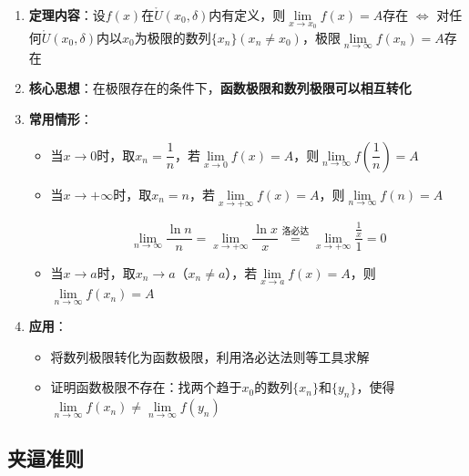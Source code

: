 \documentclass[../book.tex]{subfiles}
\begin{document}
    \begin{enumerate}
        \item \textbf{定理内容}：设$f(x)$在$\mathring{U}(x_0, \delta)$内有定义，则$\lim\limits_{x\to x_0} f(x) = A$存在 $\Leftrightarrow$ 对任何$\mathring{U}(x_0, \delta)$内以$x_0$为极限的数列$\{x_n\}(x_n \neq x_0)$，极限$\lim\limits_{n\to\infty} f(x_n) = A$存在

        \item \textbf{核心思想}：在极限存在的条件下，\textbf{函数极限和数列极限可以相互转化}

        \item \textbf{常用情形}：
        \begin{itemize}
            \item 当$x\to 0$时，取$x_n = \dfrac{1}{n}$，若$\lim\limits_{x\to 0} f(x) = A$，则$\lim\limits_{n\to\infty} f\left(\dfrac{1}{n}\right) = A$
            \item 当$x\to +\infty$时，取$x_n = n$，若$\lim\limits_{x\to +\infty} f(x) = A$，则$\lim\limits_{n\to\infty} f(n) = A$
            \begin{analysisbox}[Example]
                \[
                    \lim_{n\to\infty}\frac{\ln n}{n}
                    = \lim_{x\to+\infty}\frac{\ln x}{x}
                    \overset{\text{洛必达}}=
                    \lim_{x\to+\infty}\frac{\displaystyle\frac{1}{x}}{1}
                    = 0
                \]
            \end{analysisbox}
            \item 当$x\to a$时，取$x_n \to a$（$x_n \neq a$），若$\lim\limits_{x\to a} f(x) = A$，则$\lim\limits_{n\to\infty} f(x_n) = A$
        \end{itemize}

        \item \textbf{应用}：
        \begin{itemize}
            \item 将数列极限转化为函数极限，利用洛必达法则等工具求解
            \item 证明函数极限不存在：找两个趋于$x_0$的数列$\{x_n\}$和$\{y_n\}$，使得$\lim\limits_{n\to\infty} f(x_n) \neq \lim\limits_{n\to\infty} f(y_n)$
        \end{itemize}
    \end{enumerate}

    \subsection{夹逼准则}
\end{document}
